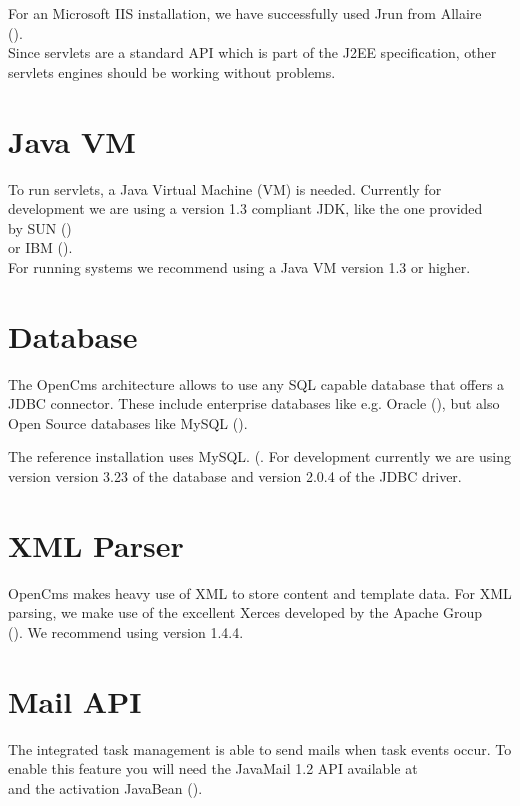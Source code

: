 For an Microsoft IIS installation, we have successfully used Jrun from Allaire \\
().\\
Since servlets are a standard API which is part of the J2EE specification,
other servlets engines should be working without problems.

\section{Java VM}
To run servlets, a Java Virtual Machine (VM) is needed. Currently for development we are using
a version 1.3 compliant JDK, like the one provided \\
by SUN ()\\
or IBM ().\\
For running systems we recommend using a Java VM version 1.3 or
higher.

\section{Database}
The OpenCms architecture allows to use any SQL capable database that offers a JDBC connector.
These include enterprise databases like e.g. Oracle (),
but also Open Source databases like MySQL ().

The reference installation uses MySQL. (. 
For development currently we are using version version 3.23 of the database and version 2.0.4 of the
JDBC driver.

\section{XML Parser}
OpenCms makes heavy use of XML to store content and template data. For XML parsing, we make use of
the excellent Xerces developed by the Apache Group\\
().
We recommend using version 1.4.4.

\section{Mail API}
The integrated task management is able to send mails when task events occur.
To enable this feature you will need the JavaMail 1.2 API available at \\
 and the activation Java\-Bean
().

